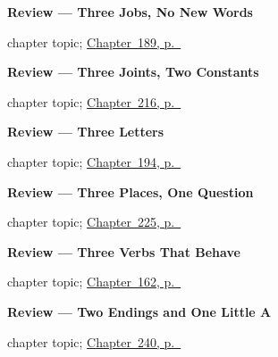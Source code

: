 \noindent\begin{minipage}[t]{\linewidth}
\raggedright
\textbf{Review --- Three Jobs, No New Words}\par
\footnotesize chapter topic; \hyperref[ch:review-relative]{Chapter~189, p.~\pageref*{ch:review-relative}}
\end{minipage}\par\smallskip

\noindent\begin{minipage}[t]{\linewidth}
\raggedright
\textbf{Review --- Three Joints, Two Constants}\par
\footnotesize chapter topic; \hyperref[ch:repaso-reportar]{Chapter~216, p.~\pageref*{ch:repaso-reportar}}
\end{minipage}\par\smallskip

\noindent\begin{minipage}[t]{\linewidth}
\raggedright
\textbf{Review --- Three Letters}\par
\footnotesize chapter topic; \hyperref[ch:review-hay]{Chapter~194, p.~\pageref*{ch:review-hay}}
\end{minipage}\par\smallskip

\noindent\begin{minipage}[t]{\linewidth}
\raggedright
\textbf{Review --- Three Places, One Question}\par
\footnotesize chapter topic; \hyperref[ch:repaso-demostrativos]{Chapter~225, p.~\pageref*{ch:repaso-demostrativos}}
\end{minipage}\par\smallskip

\noindent\begin{minipage}[t]{\linewidth}
\raggedright
\textbf{Review --- Three Verbs That Behave}\par
\footnotesize chapter topic; \hyperref[ch:spanish-review-ordinary-verbs]{Chapter~162, p.~\pageref*{ch:spanish-review-ordinary-verbs}}
\end{minipage}\par\smallskip

\noindent\begin{minipage}[t]{\linewidth}
\raggedright
\textbf{Review --- Two Endings and One Little A}\par
\footnotesize chapter topic; \hyperref[ch:repaso-gerundio]{Chapter~240, p.~\pageref*{ch:repaso-gerundio}}
\end{minipage}\par\smallskip

